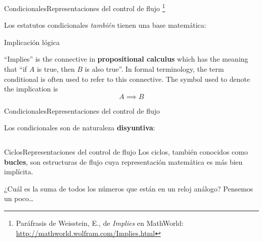 \documentclass[spanish, c, handout]{beamer}
\newcommand\blfootnote[1]{%
\begingroup
\renewcommand\thefootnote{}\footnote{#1}%
\addtocounter{footnote}{-1}%
\endgroup
}
\begin{document}
\begin{frame}{Condicionales}{Representaciones del control de flujo}
    \blfootnote{Paráfrasis de Weisstein, E., de \textit{Implies} en MathWorld: \url{http://mathworld.wolfram.com/Implies.html}}

    Los estatutos condicionales \textit{también} tienen una base matemática: \pause

    \bigskip

    \begin{block}{Implicación lógica}
        \begin{displayquote}
            ``Implies'' is the connective in \textbf{propositional calculus} which has the meaning that ``if $A$ is true, then $B$ is also true''.
            In formal terminology, the term conditional is often used to refer to this connective. The symbol used to denote the implication is $$A \implies B$$
        \end{displayquote}
    \end{block}
\end{frame}

\begin{frame}{Condicionales}{Representaciones del control de flujo}

    Los condicionales son de naturaleza \textbf{disyuntiva}:

    \bigskip

    \begin{columns}
        \begin{column}{0.9\linewidth}
            
        \end{column}
    \end{columns}

\end{frame}

\begin{frame}{Ciclos}{Representaciones del control de flujo}
    Los \alert{ciclos}, también conocidos como \textbf{bucles}, son estructuras de flujo cuya representación matemática es más bien implícita. \pause

    \bigskip

    ¿Cuál es la suma de todos los números que están en un reloj análogo? \pause Pensemos un poco\dots
\end{frame}
\end{document}
